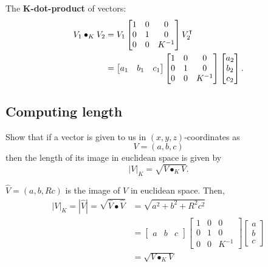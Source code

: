 \documentclass{ximera}
\begin{document}
\begin{definition}
The \textbf{$\boldsymbol{K}$-dot-product} of vectors:%
\begin{align*}
V_{1}\bullet_{K}V_{2}  &=V_{1} 
\begin{bmatrix}
1 & 0 & 0\\
0 & 1 & 0\\
0 & 0 & K^{-1}%
\end{bmatrix}
V_{2}^\transpose\\
&=
\begin{bmatrix}
a_{1} & b_{1} & c_{1}%
\end{bmatrix}
\begin{bmatrix}
1 & 0 & 0\\
0 & 1 & 0\\
0 & 0 & K^{-1}%
\end{bmatrix}
\begin{bmatrix}
a_{2}\\
b_{2}\\
c_{2}%
\end{bmatrix}.
\end{align*}

\end{definition}

\subsection{Computing length}

\begin{problem}
  Show that if a vector is given to us in $(x,y,z)$-coordinates as%
\[
V =\left(a,b,c\right)
\]
then the length of its image in euclidean space is given by
\[
|V|_K=\sqrt{V\bullet_K V}.
\]

\begin{freeResponse}
$\hat{V} = \left(a,b,Rc \right)$ is the image of $V$ in euclidean space. Then,
\begin{align*}
|V|_K = |\hat{V}| = \sqrt{\hat{V}\bullet\hat{V}} 
&= \sqrt{a^{2} + b^{2} + R^{2}c^{2}} \\
&= \begin{bmatrix}
a & b & c%
\end{bmatrix}
\begin{bmatrix}
1 & 0 & 0\\
0 & 1 & 0\\
0 & 0 & K^{-1}%
\end{bmatrix}
\begin{bmatrix}
a\\
b\\
c%
\end{bmatrix} \\
&= \sqrt{V\bullet_K V}
\end{align*}
\end{freeResponse} 
\end{problem}
\end{document}
